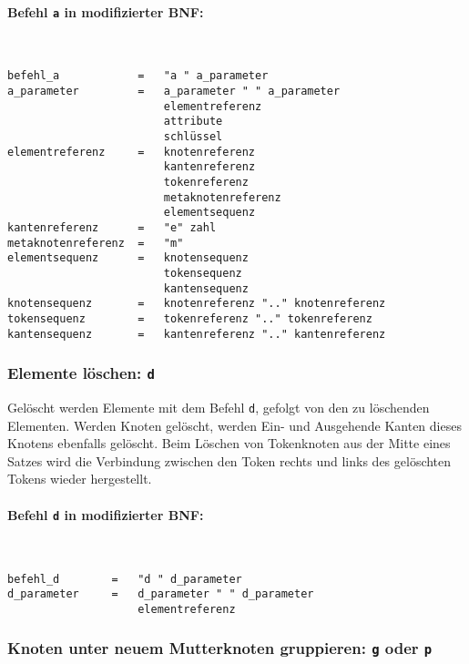 \documentclass[12pt]{scrartcl}
\begin{document}
\paragraph*{Befehl \texttt{a} in modifizierter BNF:}
~
\begin{framed}
\begin{lstlisting}
befehl_a            =   "a " a_parameter
a_parameter         =   a_parameter " " a_parameter
                        elementreferenz
                        attribute
                        schlüssel
elementreferenz     =   knotenreferenz
                        kantenreferenz
                        tokenreferenz
                        metaknotenreferenz
                        elementsequenz
kantenreferenz      =   "e" zahl
metaknotenreferenz  =   "m"
elementsequenz      =   knotensequenz
                        tokensequenz
                        kantensequenz
knotensequenz       =   knotenreferenz ".." knotenreferenz
tokensequenz        =   tokenreferenz ".." tokenreferenz
kantensequenz       =   kantenreferenz ".." kantenreferenz
\end{lstlisting}
\end{framed}




\subsubsection{Elemente löschen: \texttt{d}}

Gelöscht werden Elemente mit dem Befehl \texttt{d}, gefolgt von den zu löschenden Elementen. Werden Knoten gelöscht, werden Ein- und Ausgehende Kanten dieses Knotens ebenfalls gelöscht. Beim Löschen von Tokenknoten aus der Mitte eines Satzes wird die Verbindung zwischen den Token rechts und links des gelöschten Tokens wieder hergestellt.
\paragraph*{Befehl \texttt{d} in modifizierter BNF:}
~
\begin{framed}
\begin{lstlisting}
befehl_d        =   "d " d_parameter
d_parameter     =   d_parameter " " d_parameter
                    elementreferenz
\end{lstlisting}
\end{framed}


\subsubsection{Knoten unter neuem Mutterknoten gruppieren: \texttt{g} oder \texttt{p}}
\end{document}
